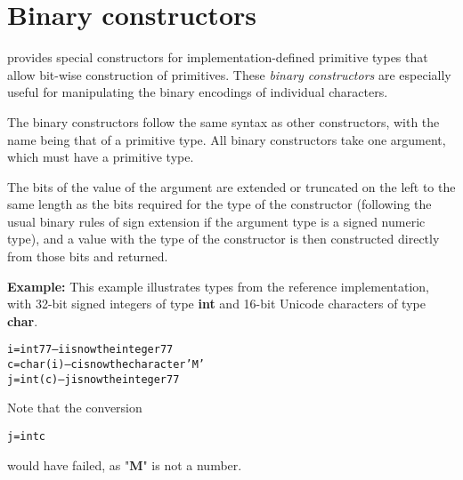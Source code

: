 \section{Binary constructors}\label{refbincon}
 
\nr{} provides special constructors for implementation-defined
primitive types that allow bit-wise construction of primitives.
These \emph{binary constructors} are especially useful for
manipulating the binary encodings of individual characters.
 
The binary constructors follow the same syntax as other constructors,
with the name being that of a primitive type.  All binary constructors
take one argument, which must have a primitive type.
 
The bits of the value of the argument are extended or truncated on the
left to the same length as the bits required for the type of the
constructor (following the usual binary rules of sign extension if the
argument type is a signed numeric type), and a value with the type of
the constructor is then constructed directly from those bits and
returned.

\textbf{Example:}
 This example illustrates types from the reference implementation,
with 32-bit signed integers of type \textbf{int} and 16-bit Unicode
characters of type \textbf{char}.
\begin{alltt}
i=int 77   -- i is now the integer 77
c=char(i)  -- c is now the character 'M'
j=int(c)   -- j is now the integer 77
\end{alltt}
Note that the conversion
\begin{alltt}
j=int c
\end{alltt}
would have failed, as "\textbf{M}" is not a number.
